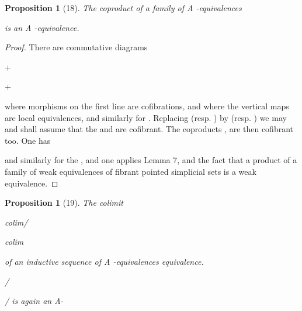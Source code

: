 \documentclass[11pt,a4paper]{article}
\theoremstyle{plain}
\newtheorem{proposition}[theorem]{Proposition}
\theoremstyle{definition}
\begin{document}
\begin{proposition}[18]
The coproduct of a family of A -equivalences

 



is an A -equivalence.
\end{proposition}

\begin{proof} There are commutative diagrams



    




+







    
+

where morphisms on the first line are cofibrations, and where the vertical maps are
local equivalences, and similarly for . Replacing  (resp.  ) by  (resp.  )
we may and shall assume that the  and  are cofibrant. The coproducts
,
 are then cofibrant too. One has







   







  












and similarly for the  , and one applies Lemma 7, and the fact that a product of a family of weak equivalences of fibrant pointed simplicial sets is a weak
equivalence.

\end{proof}

\begin{proposition}[19]
The colimit

 colim/

colim

of an inductive sequence of A -equivalences
equivalence.



 /

/ is again an A-

\end{proposition}
\end{document}
